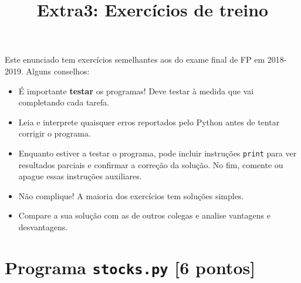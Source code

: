 \documentclass{article}
\renewcommand{\j}[1]{\texttt{#1}}
\begin{document}
\title{\vspace{-1in}Extra3: Exercícios de treino}
\author{}
\date{}
\maketitle

\vspace{-8ex}
\noindent
Este enunciado tem exercícios semelhantes aos
do exame final de FP em 2018-2019.
Alguns conselhos:
{\footnotesize
\begin{itemize}
\item
É importante \textbf{testar} os programas!
Deve testar à medida que vai completando cada tarefa.
\item
Leia e interprete quaisquer erros reportados pelo Python
antes de tentar corrigir o programa.
\item
Enquanto estiver a testar o programa,
pode incluir instruções \j{print} para ver resultados parciais
e confirmar a correção da solução.
No fim, comente ou apague essas instruções auxiliares.
\item
Não complique!
A maioria dos exercícios tem soluções simples.
\item
Compare a sua solução com as de outros colegas
e analise vantagens e desvantagens.
\end{itemize}
}
\noindent

\section{Programa \j{stocks.py} [6 pontos]}
\end{document}
